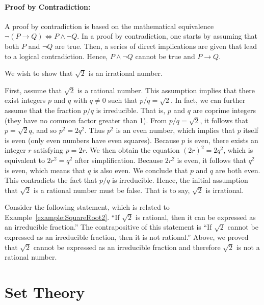 \paragraph{Proof by Contradiction:}
A proof by contradiction is based on the mathematical equivalence $\neg (P \rightarrow Q) \Leftrightarrow P \wedge \neg Q$.
In a proof by contradiction, one starts by assuming that both $P$ and $\neg Q$ are true.
Then, a series of direct implications are given that lead to a logical contradiction.
Hence, $P \wedge \neg Q$ cannot be true and $P \rightarrow Q$.

\begin{example} \label{example:SquareRoot2}
We wish to show that $\sqrt{2}$ is an irrational number.

First, assume that $\sqrt{2}$ is a rational number.
This assumption implies that there exist integers $p$ and $q$ with $q \neq 0$ such that $p/q = \sqrt{2}$.
In fact, we can further assume that the fraction $p/q$ is irreducible.
That is, $p$ and $q$ are coprime integers (they have no common factor greater than 1).
From $p/q = \sqrt{2}$, it follows that $p = \sqrt{2} q$, and so $p^2 = 2 q^2$.
Thus $p^2$ is an even number, which implies that $p$ itself is even (only even numbers have even squares).
Because $p$ is even, there exists an integer $r$ satisfying $p = 2r$.
We then obtain the equation $(2r)^2 = 2q^2$, which is equivalent to $2r^2 = q^2$ after simplification.
Because $2r^2$ is even, it follows that $q^2$ is even, which means that $q$ is also even.
We conclude that $p$ and $q$ are both even.
This contradicts the fact that $p/q$ is irreducible.
Hence, the initial assumption that $\sqrt{2}$ is a rational number must be false.
That is to say, $\sqrt{2}$ is irrational.
\end{example}

\begin{example}
Consider the following statement, which is related to Example~\ref{example:SquareRoot2}.
``If $\sqrt{2}$ is rational, then it can be expressed as an irreducible fraction.''
The contrapositive of this statement is ``If $\sqrt{2}$ cannot be expressed as an irreducible fraction, then it is not rational.''
Above, we proved that $\sqrt{2}$ cannot be expressed as an irreducible fraction and therefore $\sqrt{2}$ is not a rational number.
\end{example}

\section{Set Theory}

